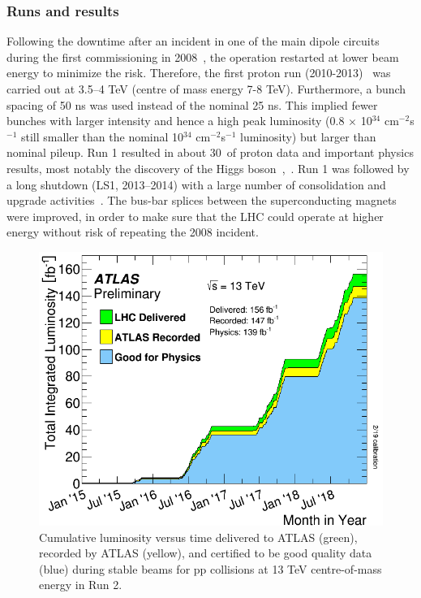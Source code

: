 \documentclass[letterpaper,12pt]{article}
\begin{document}
	\subsubsection{Runs and results}
	\label{sec:runs and results}
	Following the downtime after an incident in one of the main dipole circuits 
	during the first commissioning in 2008~\cite{lebrun2009report},
	the operation restarted at lower beam energy to minimize the risk. 
	Therefore, the first proton run (2010-2013)~\cite{alemany2013operation} was
	carried out at 3.5–4 TeV (centre of mass energy 7-8 TeV). Furthermore, a bunch spacing
	of 50 ns was used instead of the nominal 25 ns. 
	This implied fewer bunches with larger intensity and hence a 
	high peak luminosity (0.8 $\times$ 10$^{34}$ cm$^{-2}$s$^{-1}$ still smaller than
	the nominal 10$^{34}$ cm$^{-2}$s$^{-1}$ luminosity) but larger than nominal pileup. 
	Run 1 resulted in about 30~\fb of proton data and important physics results,
	most notably the discovery of the Higgs boson~\cite{HIGG-2012-27},~\cite{HIGG-2012-28}.
	Run 1 was followed by a long shutdown (LS1, 2013–2014)
	with a large number of consolidation and upgrade activities~\cite{bordry2013first}. 	
	The bus-bar splices between the superconducting magnets were improved, 
	in order to make sure that the LHC could operate at higher energy 
	without risk of repeating the 2008 incident. 

	\begin{figure}[bht]
		\begin{centering}	
		\includegraphics[width=.4\textwidth]{Detector_plots/Run2_lumi.png}
		\caption{Cumulative luminosity versus time delivered to 
		ATLAS (green), recorded by ATLAS (yellow), and certified to be 
		good quality data (blue) during stable beams for pp collisions 
		at 13 TeV centre-of-mass energy in Run 2. 
			}
		\label{fig:Run2_lumi}
		\end{centering}
	\end{figure}
	
\end{document}
